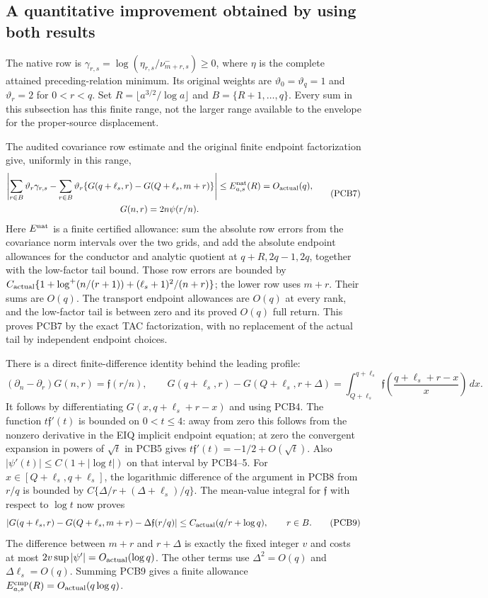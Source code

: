 \subsection{A quantitative improvement obtained by using both results}

The native row is
$\gamma_{r,s}=\log(\eta_{r,s}/\nu^-_{m+r,s})\ge0$, where $\eta$
is the complete attained preceding-relation minimum. Its original weights
are $\vartheta_0=\vartheta_q=1$ and $\vartheta_r=2$ for $0<r<q$.
Set $R=\lfloor a^{3/2}/\log a\rfloor$ and $B=\{R+1,\ldots,q\}$.
Every sum in this subsection has this finite range, not the larger range
available to the envelope for the proper-source displacement.

The audited covariance row estimate and the original finite endpoint
factorization give, uniformly in this range,
\[
\begin{gathered}
 \left|\sum_{r\in B}\vartheta_r\gamma_{r,s}
  -\sum_{r\in B}\vartheta_r
    \{G(q+\ell_s,r)-G(Q+\ell_s,m+r)\}\right|
 \le E^{\rm nat}_{a,s}(R)=O_{\rm actual}(q),
 \\ G(n,r)=2n\psi(r/n).
\end{gathered}
 \tag{PCB7}
\]
Here $E^{\rm nat}$ is a finite certified allowance: sum the absolute
row errors from the covariance norm intervals over the two grids, and add
the absolute endpoint allowances for the conductor and analytic quotient
at $q+R,2q-1,2q$, together with the low-factor tail bound. Those row errors
are bounded by
$C_{\rm actual}\{1+\log^+(n/(r+1))+
(\ell_s+1)^2/(n+r)\}$; the lower row uses $m+r$.
Their sums are $O(q)$. The transport endpoint allowances are $O(q)$
at every rank, and the low-factor tail is between zero and its proved
$O(q)$ full return. This proves PCB7 by the exact TAC factorization,
with no replacement of the actual tail by independent endpoint choices.

There is a direct finite-difference identity behind the leading profile:
\[
 (\partial_n-\partial_r)G(n,r)=\mathfrak f(r/n),\qquad
 G(q+\ell_s,r)-G(Q+\ell_s,r+\Delta)
 =\int_{Q+\ell_s}^{q+\ell_s}
  \mathfrak f\!\left(\frac{q+\ell_s+r-x}{x}\right)\,dx.
 \tag{PCB8}
\]
It follows by differentiating $G(x,q+\ell_s+r-x)$ and using PCB4.
The function $t\mathfrak f'(t)$ is bounded on $0<t\le4$:
away from zero this follows from the nonzero derivative in the EIQ
implicit endpoint equation; at zero the convergent expansion in powers
of $\sqrt t$ in PCB5 gives $t\mathfrak f'(t)=-1/2+O(\sqrt t)$.
Also $|\psi'(t)|\le C(1+|\log t|)$ on that interval by PCB4--5.
For $x\in[Q+\ell_s,q+\ell_s]$, the logarithmic difference of the
argument in PCB8 from $r/q$ is bounded by
$C\{\Delta/r+(\Delta+\ell_s)/q\}$. The mean-value integral for
$\mathfrak f$ with respect to $\log t$ now proves
\[
 \left|G(q+\ell_s,r)-G(Q+\ell_s,m+r)
                 -\Delta\mathfrak f(r/q)\right|
 \le C_{\rm actual}(q/r+\log q),\qquad r\in B.
 \tag{PCB9}
\]
The difference between $m+r$ and $r+\Delta$ is exactly the fixed integer
$v$ and costs at most $2v\sup|\psi'|=O_{\rm actual}(\log q)$.
The other terms use $\Delta^2=O(q)$ and $\Delta\ell_s=O(q)$.
Summing PCB9 gives a finite allowance
$E^{\rm cmp}_{a,s}(R)=O_{\rm actual}(q\log q)$.

